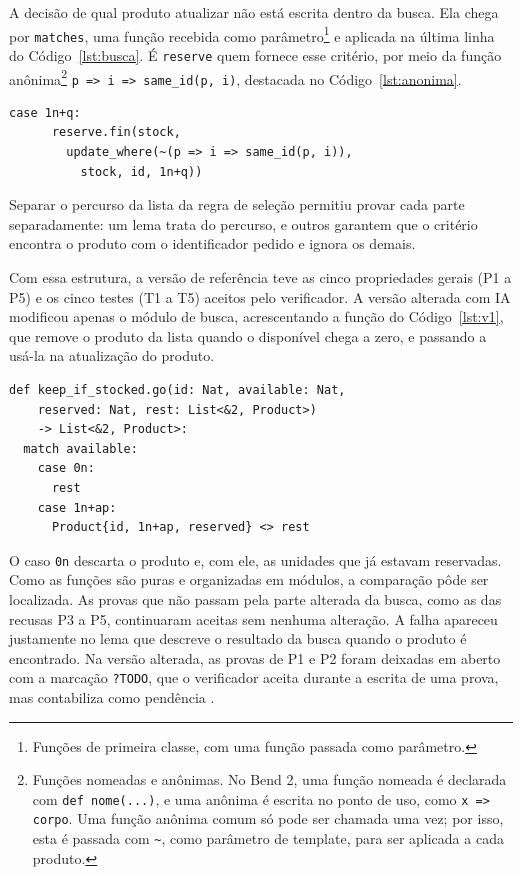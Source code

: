 A decisão de qual produto atualizar não está escrita dentro da busca. Ela chega por \texttt{matches}, uma função recebida como parâmetro\footnote{Funções de primeira classe, com uma função passada como parâmetro.} e aplicada na última linha do Código~\ref{lst:busca}. É \texttt{reserve} quem fornece esse critério, por meio da função anônima\footnote{Funções nomeadas e anônimas. No Bend 2, uma função nomeada é declarada com \texttt{def nome(...)}, e uma anônima é escrita no ponto de uso, como \texttt{x => corpo}. Uma função anônima comum só pode ser chamada uma vez; por isso, esta é passada com \texttt{\textasciitilde}, como parâmetro de template, para ser aplicada a cada produto.} \texttt{p => i => same\_id(p, i)}, destacada no Código~\ref{lst:anonima}.

\begin{lstlisting}[caption={Função anônima passada à busca.},label={lst:anonima}]
    case 1n+q:
      reserve.fin(stock,
        update_where(~(p => i => same_id(p, i)),
          stock, id, 1n+q))
\end{lstlisting}

Separar o percurso da lista da regra de seleção permitiu provar cada parte separadamente: um lema trata do percurso, e outros garantem que o critério encontra o produto com o identificador pedido e ignora os demais.

Com essa estrutura, a versão de referência teve as cinco propriedades gerais (P1 a P5) e os cinco testes (T1 a T5) aceitos pelo verificador. A versão alterada com IA modificou apenas o módulo de busca, acrescentando a função do Código~\ref{lst:v1}, que remove o produto da lista quando o disponível chega a zero, e passando a usá-la na atualização do produto.

\begin{lstlisting}[caption={Função acrescentada pela IA.},label={lst:v1}]
def keep_if_stocked.go(id: Nat, available: Nat,
    reserved: Nat, rest: List<&2, Product>)
    -> List<&2, Product>:
  match available:
    case 0n:
      rest
    case 1n+ap:
      Product{id, 1n+ap, reserved} <> rest
\end{lstlisting}

O caso \texttt{0n} descarta o produto e, com ele, as unidades que já estavam reservadas. Como as funções são puras e organizadas em módulos, a comparação pôde ser localizada. As provas que não passam pela parte alterada da busca, como as das recusas P3 a P5, continuaram aceitas sem nenhuma alteração. A falha apareceu justamente no lema que descreve o resultado da busca quando o produto é encontrado. Na versão alterada, as provas de P1 e P2 foram deixadas em aberto com a marcação \texttt{?TODO}, que o verificador aceita durante a escrita de uma prova, mas contabiliza como pendência \cite{BendLearn}.

